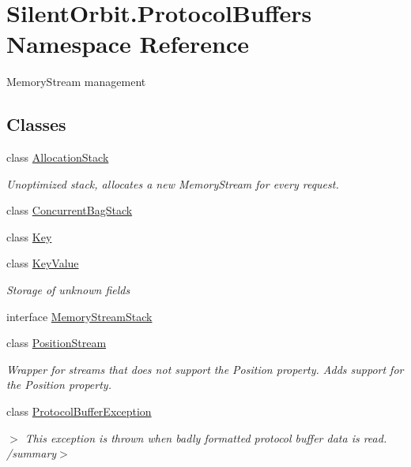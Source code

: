 \hypertarget{namespace_silent_orbit_1_1_protocol_buffers}{}\section{Silent\+Orbit.\+Protocol\+Buffers Namespace Reference}
\label{namespace_silent_orbit_1_1_protocol_buffers}


Memory\+Stream management  


\subsection*{Classes}
\begin{DoxyCompactItemize}
\item 
class \hyperlink{class_silent_orbit_1_1_protocol_buffers_1_1_allocation_stack}{Allocation\+Stack}
\begin{DoxyCompactList}\small\item\em Unoptimized stack, allocates a new Memory\+Stream for every request. \end{DoxyCompactList}\item 
class \hyperlink{class_silent_orbit_1_1_protocol_buffers_1_1_concurrent_bag_stack}{Concurrent\+Bag\+Stack}
\item 
class \hyperlink{class_silent_orbit_1_1_protocol_buffers_1_1_key}{Key}
\item 
class \hyperlink{class_silent_orbit_1_1_protocol_buffers_1_1_key_value}{Key\+Value}
\begin{DoxyCompactList}\small\item\em Storage of unknown fields \end{DoxyCompactList}\item 
interface \hyperlink{interface_silent_orbit_1_1_protocol_buffers_1_1_memory_stream_stack}{Memory\+Stream\+Stack}
\item 
class \hyperlink{class_silent_orbit_1_1_protocol_buffers_1_1_position_stream}{Position\+Stream}
\begin{DoxyCompactList}\small\item\em Wrapper for streams that does not support the Position property. Adds support for the Position property. \end{DoxyCompactList}\item 
class \hyperlink{class_silent_orbit_1_1_protocol_buffers_1_1_protocol_buffer_exception}{Protocol\+Buffer\+Exception}
\begin{DoxyCompactList}\small\item\em $>$ This exception is thrown when badly formatted protocol buffer data is read. /summary$>$ \end{DoxyCompactList}\item 

\end{DoxyCompactItemize}
